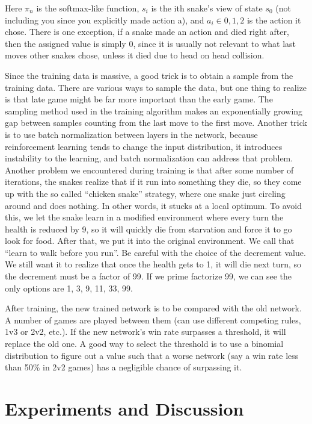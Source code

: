 \documentclass{article}
\begin{document}
Here $\pi_n$ is the softmax-like function, $s_i$ is the ith snake’s view of
state $s_0$ (not including you since you explicitly made action a), and $a_i
  \in {0,1,2}$ is the action it chose. There is one exception, if a snake made
an action and died right after, then the assigned value is simply 0, since it
is usually not relevant to what last moves other snakes chose, unless it died
due to head on head collision.

Since the training data is massive, a good trick is to obtain a sample from the
training data. There are various ways to sample the data, but one thing to
realize is that late game might be far more important than the early game. The
sampling method used in the training algorithm makes an exponentially growing
gap between samples counting from the last move to the first move. Another trick
is to use batch normalization between layers in the network, because
reinforcement learning tends to change the input distribution, it introduces
instability to the learning, and batch normalization can address that problem.
Another problem we encountered during training is that after some number of
iterations, the snakes realize that if it run into something they die, so they
come up with the so called “chicken snake” strategy, where one snake just
circling around and does nothing. In other words, it stucks at a local optimum.
To avoid this, we let the snake learn in a modified environment where every turn
the health is reduced by 9, so it will quickly die from starvation and force it
to go look for food. After that, we put it into the original environment. We
call that “learn to walk before you run”. Be careful with the choice of the
decrement value. We still want it to realize that once the health gets to 1, it
will die next turn, so the decrement must be a factor of 99. If we prime
factorize 99, we can see the only options are 1, 3, 9, 11, 33, 99.

After training, the new trained network is to be compared with the old network.
A number of games are played between them (can use different competing rules,
1v3 or 2v2, etc.). If the new network’s win rate surpasses a threshold, it will
replace the old one. A good way to select the threshold is to use a binomial
distribution to figure out a value such that a worse network (say a win rate
less than 50\% in 2v2 games) has a negligible chance of surpassing it.


\section{Experiments and Discussion}
\end{document}
